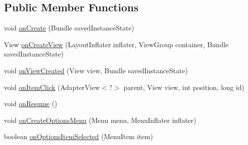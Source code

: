 \subsection*{Public Member Functions}
\begin{DoxyCompactItemize}
\item 
void \hyperlink{classorg_1_1buildmlearn_1_1toolkit_1_1fragment_1_1LoadProjectFragment_aa3475b8770215affec67dd109da8e9cb}{on\+Create} (Bundle saved\+Instance\+State)
\item 
View \hyperlink{classorg_1_1buildmlearn_1_1toolkit_1_1fragment_1_1LoadProjectFragment_a00df408d1104d5e9da684300c7d1a373}{on\+Create\+View} (Layout\+Inflater inflater, View\+Group container, Bundle saved\+Instance\+State)
\item 
void \hyperlink{classorg_1_1buildmlearn_1_1toolkit_1_1fragment_1_1LoadProjectFragment_a486509578e69cb110ec10c53c6c813c6}{on\+View\+Created} (View view, Bundle saved\+Instance\+State)
\item 
void \hyperlink{classorg_1_1buildmlearn_1_1toolkit_1_1fragment_1_1LoadProjectFragment_ab3fd6e093c178f367cf3403496d30fd5}{on\+Item\+Click} (Adapter\+View$<$?$>$ parent, View view, int position, long id)
\item 
void \hyperlink{classorg_1_1buildmlearn_1_1toolkit_1_1fragment_1_1LoadProjectFragment_af7ebf8d42c3c401e7fcad1fa3850001c}{on\+Resume} ()
\item 
void \hyperlink{classorg_1_1buildmlearn_1_1toolkit_1_1fragment_1_1LoadProjectFragment_a00797f05a8d23a1cc91dfc9a65d40b93}{on\+Create\+Options\+Menu} (Menu menu, Menu\+Inflater inflater)
\item 
boolean \hyperlink{classorg_1_1buildmlearn_1_1toolkit_1_1fragment_1_1LoadProjectFragment_a69ca5df2fa6649fb01cbd2c195ee81fa}{on\+Options\+Item\+Selected} (Menu\+Item item)
\end{DoxyCompactItemize}
